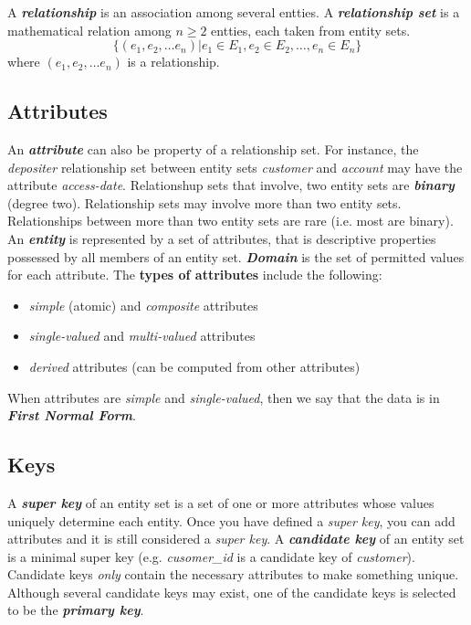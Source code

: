 \documentclass{article}
\newcommand{\bold}[1]{\textbf{#1}}
\newcommand{\define}[1]{\textbf{\textit{#1}}}
\begin{document}
A \define{relationship} is an association among several entties. A \define{relationship set} is a mathematical relation among $n \geq 2$ entties, each taken from entity sets. $$\{(e_1, e_2, \dots e_n) \vert e_1 \in E_1, e_2 \in E_2, \dots, e_n \in E_n\}$$ where $(e_1 , e_2 , \dots e_n)$ is a relationship. \\ 

\subsection{Attributes}

An \define{attribute} can also be property of a relationship set. For instance, the \emph{depositer} relationship set between entity sets \emph{customer} and \emph{account} may have the attribute \emph{access-date}. Relationshup sets that involve, two entity sets are \define{binary} (degree two). Relationship sets may involve more than two entity sets. Relationships between more than two entity sets are rare (i.e. most are binary). \\ 

An \define{entity} is represented by a set of attributes, that is descriptive properties possessed by all members of an entity set. \define{Domain} is the set of permitted values for each attribute. The \bold{types of attributes} include the following:

\begin{itemize}
  \item \emph{simple} (atomic) and \emph{composite} attributes 
  \item \emph{single-valued} and \emph{multi-valued} attributes
  \item \emph{derived} attributes (can be computed from other attributes)
\end{itemize}

When attributes are \emph{simple} and \emph{single-valued}, then we say that the data is in \define{First Normal Form}. 

\subsection{Keys}

A \define{super key} of an entity set is a set of one or more attributes whose values uniquely determine each entity. Once you have defined a \emph{super key}, you can add attributes and it is still considered a \emph{super key}. A \define{candidate key} of an entity set is a minimal super key (e.g. \emph{cusomer\_id} is a candidate key of \emph{customer}). Candidate keys \emph{only} contain the necessary attributes to make something unique. Although several candidate keys may exist, one of the candidate keys is selected to be the \define{primary key}. \\ 
\end{document}
